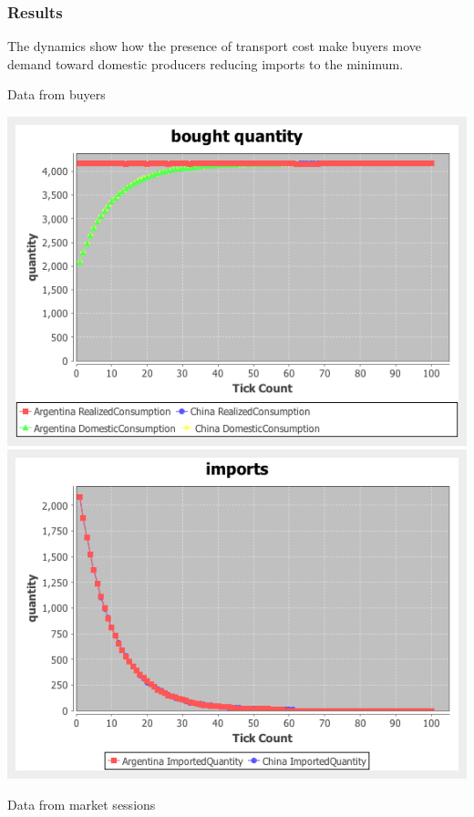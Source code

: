 \documentclass{article}
\begin{document}
\subsubsection{Results}

The dynamics show how the presence of transport cost make buyers move demand toward domestic producers reducing imports to the minimum.


Data from buyers

\vskip2mm
\hskip-2cm
\includegraphics[scale=0.4]{fig_case1_qs}
\includegraphics[scale=0.4]{fig_case1_imports}

\noindent Data from market sessions
\end{document}
